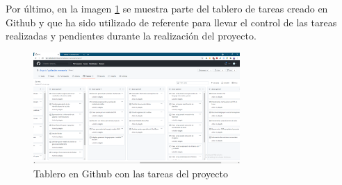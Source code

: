 Por último, en la imagen \ref{fig:tablero-github} se muestra parte del tablero de tareas creado en Github y que ha sido utilizado de referente para llevar el control de las tareas realizadas y pendientes durante la realización del proyecto.

\begin{figure}[hp!]
	\centering
	\includegraphics[angle=90,width=0.70\textwidth]{imaxes/f-planificacion/tablero-planificacion}
	\caption{Tablero en Github con las tareas del proyecto}
	\label{fig:tablero-github}
\end{figure}
